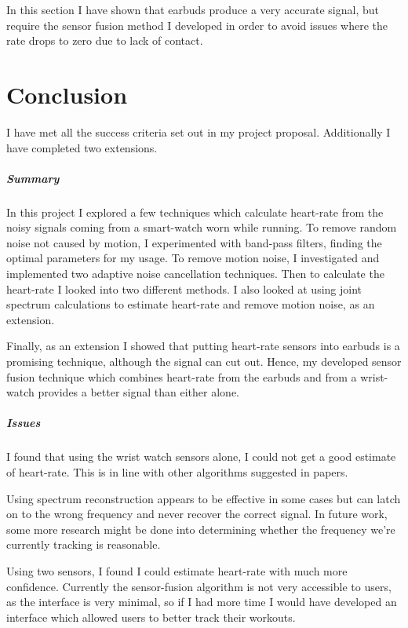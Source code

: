 \documentclass[12pt,a4paper,twoside,openany]{report}
\begin{document}
In this section I have shown that earbuds produce a very accurate signal, but
require the sensor fusion method I developed in order to avoid issues where
the rate drops to zero due to lack of contact.

\chapter{Conclusion}

I have met all the success criteria set out in my project proposal.
Additionally I have completed two extensions.

\paragraph{Summary}

In this project I explored a few techniques which calculate heart-rate from
the noisy signals coming from a smart-watch worn while running. To remove
random noise not caused by motion, I experimented with band-pass filters,
finding the optimal parameters for my usage. To remove motion noise, I
investigated and implemented two adaptive noise cancellation techniques. Then
to calculate the heart-rate I looked into two different methods. I also
looked at using joint spectrum calculations to estimate heart-rate and remove
motion noise, as an extension.

Finally, as an extension I showed that putting heart-rate sensors into earbuds is a promising
technique, although the signal can cut out. Hence, my developed sensor fusion
technique which combines heart-rate from the earbuds and from a wrist-watch
provides a better signal than either alone.

\paragraph{Issues}

I found that using the wrist watch sensors alone, I could not get a 
good estimate of heart-rate. This is in line with other algorithms suggested
in papers.

Using spectrum reconstruction appears to be effective in some cases but can
latch on to the wrong frequency and never recover the correct signal. In
future work, some more research might be done into determining whether the
frequency we're currently tracking is reasonable.

Using two sensors, I found I could estimate heart-rate with much more
confidence. Currently the sensor-fusion algorithm is not very accessible to
users, as the interface is very minimal, so if I had more time I would have
developed an interface which allowed users to better track their workouts.
\end{document}
